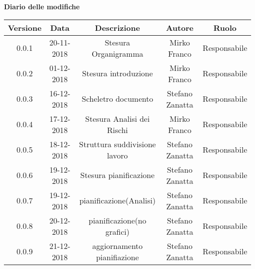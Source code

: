 	\begin{center}
		\textbf{Diario delle modifiche}
	\end{center}
	\begin{center}
		\begin{tabular}{|c|c|c|c|c|}
			\hline
			\textbf{Versione} & \textbf{Data} & \textbf{Descrizione} & \textbf{Autore} & \textbf{Ruolo} \\
			\hline
			0.0.1 & 20-11-2018 & Stesura Organigramma & Mirko Franco & Responsabile\\
			\hline
			0.0.2 & 01-12-2018 & Stesura introduzione & Mirko Franco & Responsabile\\
			\hline
			0.0.3 & 16-12-2018 & Scheletro documento &Stefano Zanatta & Responsabile\\
			\hline
			0.0.4 & 17-12-2018 & Stesura Analisi dei Rischi & Mirko Franco & Responsabile\\
			\hline
			0.0.5 & 18-12-2018 & Struttura suddivisione lavoro & Stefano Zanatta & Responsabile\\
			\hline
			0.0.6 & 19-12-2018 & Stesura pianificazione & Stefano Zanatta & Responsabile\\
			\hline
			0.0.7 & 19-12-2018 & pianificazione(Analisi) & Stefano Zanatta & Responsabile\\
			\hline
			0.0.8 & 20-12-2018 & pianificazione(no grafici) & Stefano Zanatta & Responsabile\\
			\hline
			0.0.9 & 21-12-2018 & aggiornamento pianifiazione & Stefano Zanatta & Responsabile\\
			\hline
			
		\end{tabular}
	\end{center}
\newpage